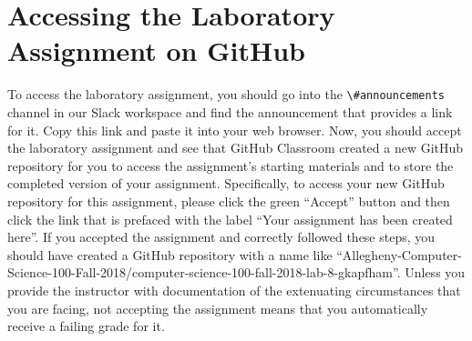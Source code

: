 \documentclass[11pt]{article}
\newcommand{\command}[1]{``\lstinline{#1}''}
\newcommand{\channel}[1]{\lstinline{#1}}
\begin{document}
\section*{Accessing the Laboratory Assignment on GitHub}

To access the laboratory assignment, you should go into the
\channel{\#announcements} channel in our Slack workspace and find the
announcement that provides a link for it. Copy this link and paste it into your
web browser. Now, you should accept the laboratory assignment and see that
GitHub Classroom created a new GitHub repository for you to access the
assignment's starting materials and to store the completed version of your
assignment. Specifically, to access your new GitHub repository for this
assignment, please click the green ``Accept'' button and then click the link
that is prefaced with the label ``Your assignment has been created here''. If
you accepted the assignment and correctly followed these steps, you should have
created a GitHub repository with a name like
``Allegheny-Computer-Science-100-Fall-2018/computer-science-100-fall-2018-lab-8-gkapfham''.
Unless you provide the instructor with documentation of the extenuating
circumstances that you are facing, not accepting the assignment means that you
automatically receive a failing grade for it.


\end{document}

